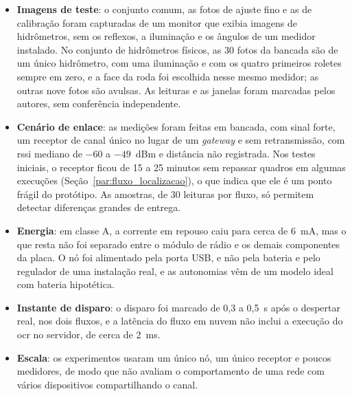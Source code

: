 \begin{itemize}
    \item \textbf{Imagens de teste}: o conjunto comum, as fotos de ajuste fino e as de
    calibração foram capturadas de um monitor que exibia imagens de hidrômetros, sem os
    reflexos, a iluminação e os ângulos de um medidor instalado. No conjunto de hidrômetros
    físicos, as 30 fotos da bancada são de um único hidrômetro, com uma iluminação e com os
    quatro primeiros roletes sempre em zero, e a face da roda foi escolhida nesse mesmo
    medidor; as outras nove fotos são avulsas. As leituras e as janelas foram marcadas pelos
    autores, sem conferência independente.
    \item \textbf{Cenário de enlace}: as medições foram feitas em bancada, com sinal forte,
    um receptor de canal único no lugar de um \textit{gateway} e sem retransmissão, com
    \gls{rssi} mediano de $-60$ a $-49$~dBm e distância não registrada. Nos testes iniciais,
    o receptor ficou de 15 a 25 minutos sem repassar quadros em algumas execuções
    (Seção~\ref{par:fluxo_localizacao}), o que indica que ele é um ponto frágil do protótipo.
    As amostras, de 30 leituras por fluxo, só permitem detectar diferenças grandes de
    entrega.
    \item \textbf{Energia}: em classe A, a corrente em repouso caiu para cerca de 6~mA, mas o
    que resta não foi separado entre o módulo de rádio e os demais componentes da placa. O nó
    foi alimentado pela porta USB, e não pela bateria e pelo regulador de uma instalação real,
    e as autonomias vêm de um modelo ideal com bateria hipotética.
    \item \textbf{Instante de disparo}: o disparo foi marcado de 0,3 a 0,5~s após o
    despertar real, nos dois fluxos, e a latência do fluxo em nuvem não inclui a execução do
    \gls{ocr} no servidor, de cerca de 2~ms.
    \item \textbf{Escala}: os experimentos usaram um único nó, um único receptor e poucos
    medidores, de modo que não avaliam o comportamento de uma rede com vários dispositivos
    compartilhando o canal.
\end{itemize}
